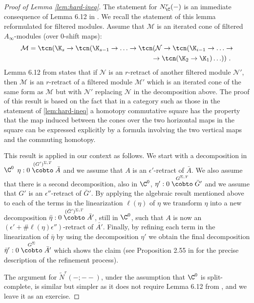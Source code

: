 \begin{proof}[Proof of Lemma \ref{lem:hard-ineq}] The statement for
  $N^{r}_{\C}(-)$ is an immediate consequence of Lemma 6.12 in
  \cite{Bi-Co-Sh:LagrSh}.  We recall the statement of this lemma
  reformulated for filtered modules. Assume that $\mathcal{M}$ is an
  iterated cone of filtered $A_{\infty}$-modules (over $0$-shift
  maps):
  \begin{eqnarray*}
    \mathcal{M}=\tcn(\K_{s} \to \tcn(\K_{s-1}\to \ldots
    \to\tcn(\mathcal{N}\to \tcn(\K_{i-1} \to \ldots \to \\ \to
    \tcn (\K_{2}\to \K_{1})\ldots ))~.~
  \end{eqnarray*}
  Lemma 6.12 from \cite{Bi-Co-Sh:LagrSh} states that if $\mathcal{N}$
  is an $r$-retract of another filtered module $\mathcal{N}'$, then
  $\mathcal{M}$ is an $r$-retract of a filtered module $\mathcal{M}'$
  which is an iterated cone of the same form as $\mathcal{M}$ but with
  $\mathcal{N}'$ replacing $\mathcal{N}$ in the decomposition above.
  The proof of this result is based on the fact that in a category
  such as those in the statement of \ref{lem:hard-ineq} a homotopy
  commutative square has the property that the map induced between the
  cones over the two horizontal maps in the square can be expressed
  explicitly by a formula involving the two vertical maps and the
  commuting homotopy.

  This result is applied in our context as follows. We start with a
  decomposition in $\C^{0}$
  $\eta: 0\stackrel{(G')^{\Sigma,T}}{\cobto} \bar{A}$ and we assume
  that $A$ is an $\epsilon'$-retract of $\bar{A}$. We also assume
  that there is a second decomposition, also in $\C^{0}$,
  $\eta':0\stackrel{G^{\Sigma,T}}{\cobto}\bar{G}'$ and we assume that
  $G'$ is an $\epsilon''$-retract of $\bar{G}'$. By applying the
  algebraic result mentioned above to each of the terms in the
  linearization $\ell(\eta)$ of $\eta$ we transform $\eta$ into a new
  decomposition
  $\bar{\eta}:0\stackrel{(\bar{G}')^{\Sigma,T}}{\cobto} \bar{A}'$,
  still in $\C^{0}$, such that $A$ is now an
  $(\epsilon' + \#\ell(\eta) \epsilon'')$-retract of $\bar{A'}$.
  Finally, by refining each term in the linearization of $\bar{\eta}$
  by using the decomposition $\eta'$ we obtain the final decomposition
  $\bar{\eta}':0\stackrel{G^{\Sigma}}{\cobto} \bar{A}'$ which shows
  the claim (see Proposition 2.55 in \cite{BCZ:tpc} for the precise
  description of the refinement process).

  The argument for $\tilde{N}^{r}(-;--)$, under the assumption that
  $\C^{0}$ is split-complete, is similar but simpler as it does not
  require Lemma 6.12 from \cite{Bi-Co-Sh:LagrSh}, and we leave it as
  an exercise.
\end{proof}

